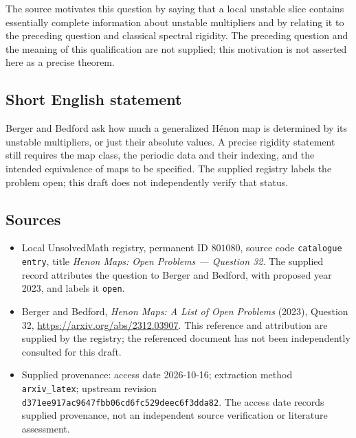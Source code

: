 \documentclass[11pt]{article}
\begin{document}
The source motivates this question by saying that a local unstable slice contains essentially complete information about unstable multipliers and by relating it to the preceding question and classical spectral rigidity. The preceding question and the meaning of this qualification are not supplied; this motivation is not asserted here as a precise theorem.
\subsection{Short English statement}
Berger and Bedford ask how much a generalized H\'enon map is determined by its unstable multipliers, or just their absolute values. A precise rigidity statement still requires the map class, the periodic data and their indexing, and the intended equivalence of maps to be specified. The supplied registry labels the problem open; this draft does not independently verify that status.
\subsection{Sources}
\begin{itemize}
\item Local UnsolvedMath registry, permanent ID \(801080\), source code \texttt{catalogue entry}, title \emph{Henon Maps: Open Problems --- Question 32}. The supplied record attributes the question to Berger and Bedford, with proposed year 2023, and labels it \texttt{open}.
\item Berger and Bedford, \emph{Henon Maps: A List of Open Problems} (2023), Question 32, \url{https://arxiv.org/abs/2312.03907}. This reference and attribution are supplied by the registry; the referenced document has not been independently consulted for this draft.
\item Supplied provenance: access date 2026-10-16; extraction method \texttt{arxiv\_latex}; upstream revision \texttt{d371ee917ac9647fbb06cd6fc529deec6f3dda82}. The access date records supplied provenance, not an independent source verification or literature assessment.
\end{itemize}
\end{document}
